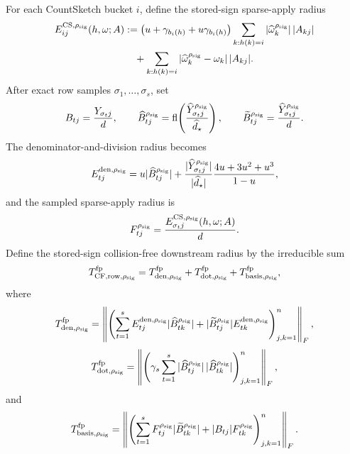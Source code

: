 \documentclass[11pt]{article}
\newcommand{\Frob}[1]{\left\lVert #1\right\rVert_F}
\newcommand{\fl}{\operatorname{fl}}
\theoremstyle{remark}
\begin{document}
For each CountSketch bucket \(i\), define the stored-sign sparse-apply radius
\[
\begin{aligned}
  E^{{\rm CS},\rho_{\rm sig}}_{ij}(h,\omega;A)
  &:=
  \bigl(u+\gamma_{b_i(h)}+u\gamma_{b_i(h)}\bigr)
  \sum_{k:h(k)=i}
      |\widehat\omega_k^{\rho_{\rm sig}}|\,|A_{kj}|\\
  &\quad+
  \sum_{k:h(k)=i}
      |\widehat\omega_k^{\rho_{\rm sig}}-\omega_k|\,|A_{kj}| .
\end{aligned}
\]
After exact row samples \(\sigma_1,\ldots,\sigma_s\), set
\[
  B_{tj}=\frac{Y_{\sigma_tj}}{d},\qquad
  \widehat B^{\rho_{\rm sig}}_{tj}
  =
  \fl\!\left(
    \frac{\widehat Y^{\rho_{\rm sig}}_{\sigma_tj}}
         {\widehat d_\star}\right),
  \qquad
  \widetilde B^{\rho_{\rm sig}}_{tj}
  =
  \frac{\widehat Y^{\rho_{\rm sig}}_{\sigma_tj}}{d}.
\]
The denominator-and-division radius becomes
\[
  E^{{\rm den},\rho_{\rm sig}}_{tj}
  =
  u|\widehat B^{\rho_{\rm sig}}_{tj}|
  +
  \frac{|\widehat Y^{\rho_{\rm sig}}_{\sigma_tj}|}
       {|\widehat d_\star|}
  \frac{4u+3u^2+u^3}{1-u},
\]
and the sampled sparse-apply radius is
\[
  F^{\rho_{\rm sig}}_{tj}
  =
  \frac{E^{{\rm CS},\rho_{\rm sig}}_{\sigma_tj}(h,\omega;A)}{d}.
\]
Define the stored-sign collision-free downstream radius by the irreducible
sum
\[
  T_{{\rm CF,row},\rho_{\rm sig}}^{\rm fp}
  =
  T_{{\rm den},\rho_{\rm sig}}^{\rm fp}
  +
  T_{{\rm dot},\rho_{\rm sig}}^{\rm fp}
  +
  T_{{\rm basis},\rho_{\rm sig}}^{\rm fp},
\]
where
\[
  T_{{\rm den},\rho_{\rm sig}}^{\rm fp}
  =
  \Frob{
    \left(
      \sum_{t=1}^{s}
      E^{{\rm den},\rho_{\rm sig}}_{tj}
      |\widehat B^{\rho_{\rm sig}}_{tk}|
      +
      |\widetilde B^{\rho_{\rm sig}}_{tj}|
      E^{{\rm den},\rho_{\rm sig}}_{tk}
    \right)_{j,k=1}^{n}},
\]
\[
  T_{{\rm dot},\rho_{\rm sig}}^{\rm fp}
  =
  \Frob{
    \left(
      \gamma_s\sum_{t=1}^{s}
      |\widehat B^{\rho_{\rm sig}}_{tj}|\,
      |\widehat B^{\rho_{\rm sig}}_{tk}|
    \right)_{j,k=1}^{n}},
\]
and
\[
  T_{{\rm basis},\rho_{\rm sig}}^{\rm fp}
  =
  \Frob{
    \left(
      \sum_{t=1}^{s}
      F^{\rho_{\rm sig}}_{tj}
      |\widetilde B^{\rho_{\rm sig}}_{tk}|
      +
      |B_{tj}|F^{\rho_{\rm sig}}_{tk}
    \right)_{j,k=1}^{n}} .
\]
\end{document}
